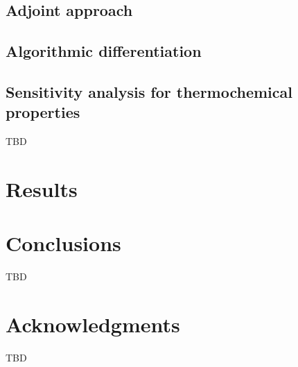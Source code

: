 \documentclass[preprint,review,12pt]{elsarticle}
\begin{document}
\subsection{Adjoint approach}

\subsection{Algorithmic differentiation}
\subsection{Sensitivity analysis for thermochemical properties}
\label{SensitivityAnalysis}

TBD 
\section{Results}


\section{Conclusions}
\label{Conclusions}

TBD

\section*{Acknowledgments}
\label{Acknowledgments}

TBD 



\end{document}
